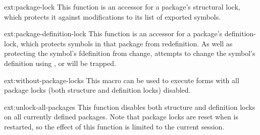 \begin{defun}{ext:}{package-lock}{}
  This function is an accessor for a package's structural lock, which
  protects it against modifications to its list of exported symbols.
\end{defun}


\begin{defun}{ext:}{package-definition-lock}{}
  This function is an accessor for a package's definition-lock, which
  protects symbols in that package from redefinition. As well as
  protecting the symbol's fdefinition from change, attempts to change
  the symbol's definition using ,  or
   will be trapped.
\end{defun}


\begin{defmac}{ext:}{without-package-locks}{}
  This macro can be used to execute forms with all package locks (both
  structure and definition locks) disabled. 
\end{defmac}


\begin{defun}{ext:}{unlock-all-packages}{}
  This function disables both structure and definition locks on all
  currently defined packages. Note that package locks are reset when
  \cmucl{} is restarted, so the effect of this function is limited to
  the current session. 
\end{defun}


